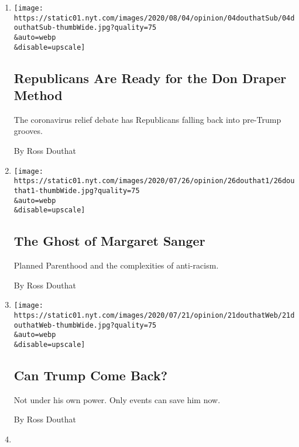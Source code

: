 \begin{enumerate}
\def\labelenumi{\arabic{enumi}.}
\item
  \href{/2020/08/04/opinion/trump-republicans-tea-party.html}{}

  \texttt{[image: https://static01.nyt.com/images/2020/08/04/opinion/04douthatSub/04douthatSub-thumbWide.jpg?quality=75\\\&auto=webp\\\&disable=upscale]}

  \hypertarget{republicans-are-ready-for-the-don-draper-method}{%
  \subsection{Republicans Are Ready for the Don Draper
  Method}\label{republicans-are-ready-for-the-don-draper-method}}

  The coronavirus relief debate has Republicans falling back into
  pre-Trump grooves.

  By Ross Douthat
\item
  \href{/2020/07/25/opinion/sunday/abortion-racism-margaret-sanger.html}{}

  \texttt{[image: https://static01.nyt.com/images/2020/07/26/opinion/26douthat1/26douthat1-thumbWide.jpg?quality=75\\\&auto=webp\\\&disable=upscale]}

  \hypertarget{the-ghost-of-margaret-sanger}{%
  \subsection{The Ghost of Margaret
  Sanger}\label{the-ghost-of-margaret-sanger}}

  Planned Parenthood and the complexities of anti-racism.

  By Ross Douthat
\item
  \href{/2020/07/21/opinion/trump-polls-election-2020.html}{}

  \texttt{[image: https://static01.nyt.com/images/2020/07/21/opinion/21douthatWeb/21douthatWeb-thumbWide.jpg?quality=75\\\&auto=webp\\\&disable=upscale]}

  \hypertarget{can-trump-come-back}{%
  \subsection{Can Trump Come Back?}\label{can-trump-come-back}}

  Not under his own power. Only events can save him now.

  By Ross Douthat
\item
  \href{/2020/07/18/opinion/sunday/white-fragility-meritocracy.html}{}


\end{enumerate}
